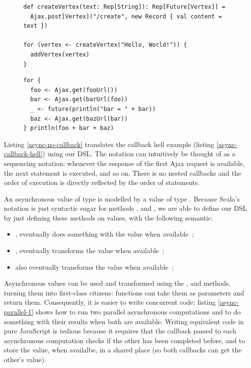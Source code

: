 \documentclass[american,english,runningheads]{llncs}
\begin{document}
\begin{figure}
\centering
\begin{lstlisting}[caption=Asynchronous values are first class citizen,label=async-first-class]
def createVertex(text: Rep[String]): Rep[Future[Vertex]] =
  Ajax.post[Vertex]("/create", new Record { val content = text })

for (vertex <- createVertex("Hello, World!")) {
  addVertex(vertex)
}
\end{lstlisting}
\end{figure}

\begin{figure}
\centering
\begin{lstlisting}[caption=No callback hell,label=async-no-callback]
for {
  foo <- Ajax.get(fooUrl())
  bar <- Ajax.get(barUrl(foo))
  _ <- future(println("bar = " + bar))
  baz <- Ajax.get(bazUrl(bar))
} println(foo + bar + baz)
\end{lstlisting}
\end{figure}

Listing \ref{async-no-callback} translates the callback hell example (listing \ref{async-callback-hell}) using
our DSL. The  notation can intuitively be thought of as a sequencing notation: whenever the response of the
first Ajax request is available, the next statement is executed, and so on. There is no nested callbacks and the
order of execution is directly reflected by the order of statements.

An asynchronous value of type  is modelled by a value of type . Because Scala’s
 notation is just syntactic sugar for methods ,  and , we are
able to define our DSL by just defining these methods on  values, with the following semantic:
\begin{itemize}
\item {}, eventually does something with the value when available~;
\item {}, eventually transforms the value when available~;
\item {} also eventually transforms the value when available~;
\end{itemize}

Asynchronous values can be used and transformed using the ,  and  methods, turning them into first-class
citizens: functions can take them as parameters and return them. Consequently, it is easier to write concurrent code:
listing \ref{async-parallel-1} shows how to run two parallel asynchronous computations and to do something with their
results when both are available. Writing equivalent code in pure JavaScript is tedious because it requires that the
callback passed to each asynchronous computation checks if the other has been completed before, and to store the
value, when availalbe, in a shared place (so both callbacks can get the other’s value).
\end{document}

